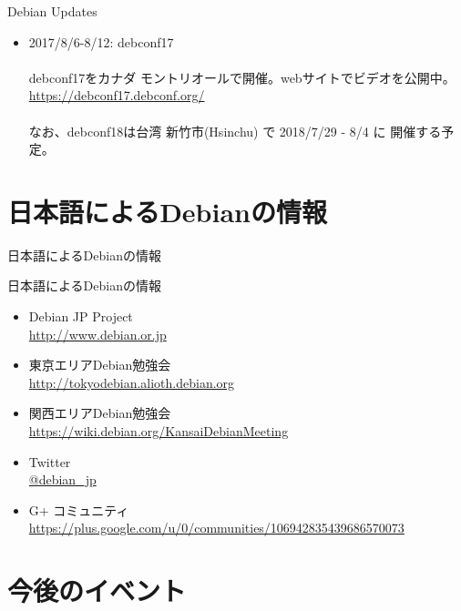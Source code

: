 \begin{frame}{Debian Updates}%

\begin{itemize}[<+->]
\item 2017/8/6-8/12:  debconf17\\
\ \\
  \small{debconf17をカナダ モントリオールで開催。webサイトでビデオを公開中。\url{https://debconf17.debconf.org/}}\\
\ \\
  \small{なお、debconf18は台湾 新竹市(Hsinchu) で 2018/7/29 - 8/4 に 開催する予定。}

\end{itemize}

\end{frame}


\section{日本語によるDebianの情報}
\begin{frame}\begin{center}\Huge{日本語によるDebianの情報}\end{center}\end{frame}

\begin{frame}{日本語によるDebianの情報}
\begin{itemize}
  \item Debian JP Project \\
      \url{http://www.debian.or.jp}
  \item 東京エリアDebian勉強会\\
      \url{http://tokyodebian.alioth.debian.org}
  \item 関西エリアDebian勉強会 \\
      \url{https://wiki.debian.org/KansaiDebianMeeting}
  \item Twitter \\
      \url{@debian_jp}
  \item G+ コミュニティ \\
      \url{https://plus.google.com/u/0/communities/106942835439686570073}
 
\end{itemize}
\end{frame}


\section{今後のイベント}

